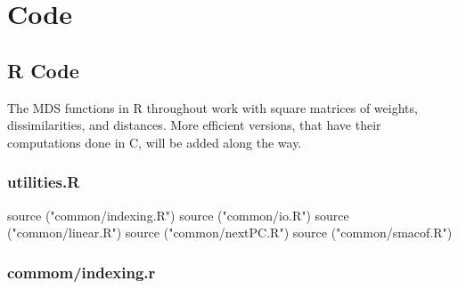 \documentclass[
  12pt,
]{book}
\newenvironment{Shaded}{\begin{snugshade}}{\end{snugshade}}
\newcommand{\FunctionTok}[1]{\textcolor[rgb]{0.00,0.00,0.00}{#1}}
\newcommand{\NormalTok}[1]{#1}
\newcommand{\StringTok}[1]{\textcolor[rgb]{0.31,0.60,0.02}{#1}}
\theoremstyle{definition}
\theoremstyle{definition}
\theoremstyle{definition}
\theoremstyle{definition}
\theoremstyle{remark}
\begin{document}
\hypertarget{appendix-appendices}{%
\appendix}


\hypertarget{apcode}{%
\chapter{Code}\label{apcode}}

\hypertarget{rapcode}{%
\section{R Code}\label{rapcode}}

The MDS functions in R throughout work with square matrices of
weights, dissimilarities, and distances. More efficient versions,
that have their computations done in C, will be added along
the way.

\hypertarget{aputilitiescode}{%
\subsection{utilities.R}\label{aputilitiescode}}

\begin{Shaded}
\begin{Highlighting}[]
\FunctionTok{source}\NormalTok{ (}\StringTok{"common/indexing.R"}\NormalTok{)}
\FunctionTok{source}\NormalTok{ (}\StringTok{"common/io.R"}\NormalTok{)}
\FunctionTok{source}\NormalTok{ (}\StringTok{"common/linear.R"}\NormalTok{)}
\FunctionTok{source}\NormalTok{ (}\StringTok{"common/nextPC.R"}\NormalTok{)}
\FunctionTok{source}\NormalTok{ (}\StringTok{"common/smacof.R"}\NormalTok{)}
\end{Highlighting}
\end{Shaded}

\hypertarget{apindexingcode}{%
\subsection{commom/indexing.r}\label{apindexingcode}}
\end{document}
